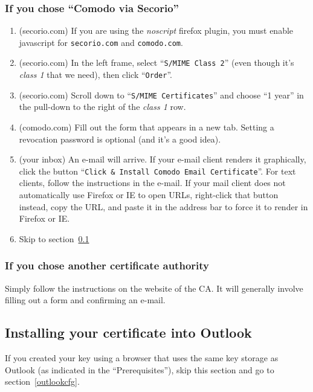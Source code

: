 \documentclass[pdftex,12pt,titlepage=false]{scrartcl}
\begin{document}
\subsubsection{If you chose ``Comodo via Secorio''}
\begin{multicols}{2}
  \begin{enumerate}
  \item (secorio.com) If you are using the \emph{noscript} firefox
    plugin, you must enable javascript for \texttt{secorio.com} and
    \texttt{comodo.com}.
  \item (secorio.com) In the left frame, select ``\texttt{S/MIME Class
      2}'' (even though it's \emph{class 1} that we need), then click
    ``\texttt{Order}''.
  \item (secorio.com) Scroll down to ``\texttt{S/MIME Certificates}''
    and choose ``1 year'' in the pull-down to the right of the
    \emph{class 1} row.
  \item (comodo.com) Fill out the form that appears in a new tab.
    Setting a revocation password is optional (and it's a good
    idea).%
  \item (your inbox) An e-mail will arrive.  If your e-mail client
    renders it graphically, click the button ``\texttt{Click \&
      Install Comodo Email Certificate}''.  For text clients, follow
    the instructions in the e-mail.  If your mail client does not
    automatically use Firefox or IE to open URLs, right-click that
    button instead, copy the URL, and paste it in the address bar to
    force it to render in Firefox or IE.
  \item Skip to section~\ref{cert_install}
  \end{enumerate}
\end{multicols}

\subsubsection{If you chose another certificate authority}
Simply follow the instructions on the website of the CA.  It will
generally involve filling out a form and confirming an e-mail.

\subsection{Installing your certificate into Outlook}\label{cert_install}
If you created your key using a browser that uses the same key storage
as Outlook (as indicated in the ``Prerequisites''), skip this section
and go to section~\ref{outlookcfg}.
\end{document}
